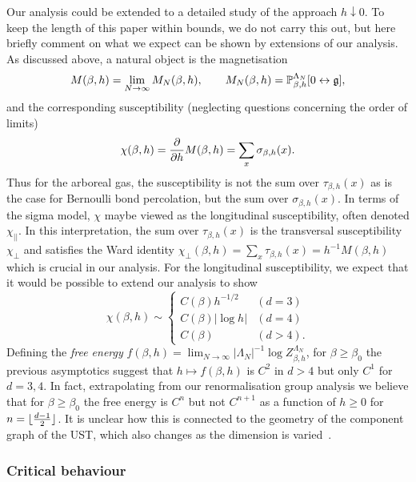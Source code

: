 \documentclass[11pt]{amsart}
\numberwithin{equation}{section}
\numberwithin{theorem}{section}
\newcommand{\ghost}{\mathfrak{g}}
\newcommand{\conn}{\leftrightarrow}
\newcommand{\1}{{\bf 1}}
\begin{document}
Our analysis could be extended to a detailed study of the approach
$h\downarrow 0$. To keep the length of this paper within bounds, we do
not carry this out, but here briefly comment on what we expect can be
shown by extensions of our analysis.
As discussed above, a natural object is the magnetisation 
\begin{equation}
  M(\beta,h) = \lim_{N\to\infty} M_{N}(\beta,h), \qquad M_{N}(\beta,h) = \P^{\Lambda_{N}}_{\beta,h}[0\conn\ghost],
\end{equation}
and the corresponding susceptibility (neglecting questions concerning
the order of limits) 
\begin{equation}
  \chi(\beta,h)
  = \frac{\partial }{\partial h}M(\beta,h)
  = \sum_{x} \sigma_{\beta,h}(x).
\end{equation}
Thus for the arboreal gas, the susceptibility is not the sum over
$\tau_{\beta,h}(x)$ as is the case for Bernoulli bond percolation, but
the sum over $\sigma_{\beta,h}(x)$. In terms of the sigma model,
$\chi$ maybe viewed as the longitudinal susceptibility, often denoted $\chi_{||}$.
In this interpretation, the sum over $\tau_{\beta,h}(x)$ is the transversal susceptibility
$\chi_{\perp}$ and satisfies the Ward identity
$\chi_{\perp}(\beta,h)=\sum_{x} \tau_{\beta,h}(x) = h^{-1}M(\beta,h)$ 
which is crucial in our analysis. For the longitudinal
susceptibility, we expect that it would be possible to extend our
analysis to show
\begin{equation}
    \chi(\beta,h) \sim \begin{cases}
    C(\beta) h^{-1/2} & (d=3)
    \\
    C(\beta) |\log h|& (d=4)
    \\
    C(\beta) & (d>4).
  \end{cases}
\end{equation}
Defining the \emph{free energy}
$f(\beta,h)=\lim_{N\to\infty} |\Lambda_N|^{-1}\log
Z_{\beta,h}^{\Lambda_{N}}$, for $\beta \geq \beta_0$ the previous asymptotics suggest that
$h\mapsto f(\beta,h)$ is $C^2$ in $d>4$ but only $C^1$ for $d=3,4$.
In fact, extrapolating from our renormalisation group analysis we believe that
for $\beta \geq \beta_0$ the free energy is $C^n$ but not $C^{n+1}$ as
a function of $h\geq 0$ for $n=\lfloor {\frac{d-1}{2}} \rfloor$.  It is unclear
how this is connected to the geometry of the component graph of the
UST, which also changes as the dimension is
varied~\cite{MR2123930,MR4009707}.

\subsubsection*{Critical behaviour}
\end{document}
